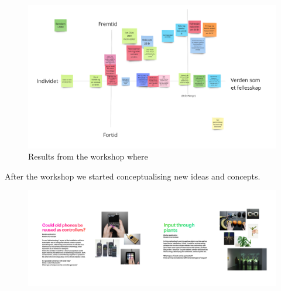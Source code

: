 \begin{figure}[H]
\includegraphics[width=12.5cm]{pictures/process/workshop_results.png}
\caption{Results from the workshop where }
\centering 
\end{figure}

After the workshop we started conceptualising new ideas and concepts.

\begin{figure}[H]
\includegraphics[width=13cm]{pictures/process/mini_pitches.png}
\centering 
\end{figure}

